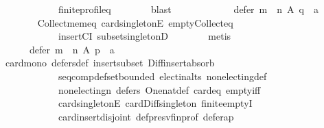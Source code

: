 \begin{isabellebody}
\ \ \ \ \ \ \ \ \ \ \ \ finite{\isacharunderscore}{\kern0pt}profile{\isacharunderscore}{\kern0pt}q\isanewline
\ \ \ \ \ \ \isamarkupfalse%
\ blast\isanewline
\ \ \ \ \isamarkupfalse%
\ \isamarkupfalse%
\isanewline
\ \ \ \ \ \ {\isachardoublequoteopen}defer\ {\isacharparenleft}{\kern0pt}m\ {\isasymtriangleright}\ n{\isacharparenright}{\kern0pt}\ A\ q\ {\isacharequal}{\kern0pt}\ {\isacharbraceleft}{\kern0pt}a{\isacharbraceright}{\kern0pt}{\isachardoublequoteclose}\ \isanewline
\ \ \ \ \ \ \isamarkupfalse%
\ Collect{\isacharunderscore}{\kern0pt}mem{\isacharunderscore}{\kern0pt}eq\ card{\isacharunderscore}{\kern0pt}{}{\isacharunderscore}{\kern0pt}singletonE\ empty{\isacharunderscore}{\kern0pt}Collect{\isacharunderscore}{\kern0pt}eq\isanewline
\ \ \ \ \ \ \ \ \ \ \ \ insertCI\ subset{\isacharunderscore}{\kern0pt}singletonD\isanewline
\ \ \ \ \ \ \isamarkupfalse%
\ metis\isanewline
\ \ \ \ \isamarkupfalse%
\ \isamarkupfalse%
\isanewline
\ \ \ \ \ \ {\isachardoublequoteopen}defer\ {\isacharparenleft}{\kern0pt}m\ {\isasymtriangleright}\ n{\isacharparenright}{\kern0pt}\ A\ p\ {\isacharequal}{\kern0pt}\ {\isacharbraceleft}{\kern0pt}a{\isacharbraceright}{\kern0pt}{\isachardoublequoteclose}\ \isanewline
\ \ \ \ \ \ \isamarkupfalse%
\ card{\isacharunderscore}{\kern0pt}mono\ defers{\isacharunderscore}{\kern0pt}def\ insert{\isacharunderscore}{\kern0pt}subset\ Diff{\isacharunderscore}{\kern0pt}insert{\isacharunderscore}{\kern0pt}absorb\isanewline
\ \ \ \ \ \ \ \ \ \ \ \ seq{\isacharunderscore}{\kern0pt}comp{\isacharunderscore}{\kern0pt}def{\isacharunderscore}{\kern0pt}set{\isacharunderscore}{\kern0pt}bounded\ elect{\isacharunderscore}{\kern0pt}in{\isacharunderscore}{\kern0pt}alts\ non{\isacharunderscore}{\kern0pt}electing{\isacharunderscore}{\kern0pt}def\isanewline
\ \ \ \ \ \ \ \ \ \ \ \ non{\isacharunderscore}{\kern0pt}electing{\isacharunderscore}{\kern0pt}n\ defers{\isacharunderscore}{\kern0pt}{}\ One{\isacharunderscore}{\kern0pt}nat{\isacharunderscore}{\kern0pt}def\ card{\isacharunderscore}{\kern0pt}{}{\isacharunderscore}{\kern0pt}eq\ empty{\isacharunderscore}{\kern0pt}iff\isanewline
\ \ \ \ \ \ \ \ \ \ \ \ card{\isacharunderscore}{\kern0pt}{}{\isacharunderscore}{\kern0pt}singletonE\ card{\isacharunderscore}{\kern0pt}Diff{\isacharunderscore}{\kern0pt}singleton\ finite{\isachardot}{\kern0pt}emptyI\isanewline
\ \ \ \ \ \ \ \ \ \ \ \ card{\isacharunderscore}{\kern0pt}insert{\isacharunderscore}{\kern0pt}disjoint\ def{\isacharunderscore}{\kern0pt}presv{\isacharunderscore}{\kern0pt}fin{\isacharunderscore}{\kern0pt}prof\ defer{\isacharunderscore}{\kern0pt}a{\isacharunderscore}{\kern0pt}p\isanewline

\end{isabellebody}
